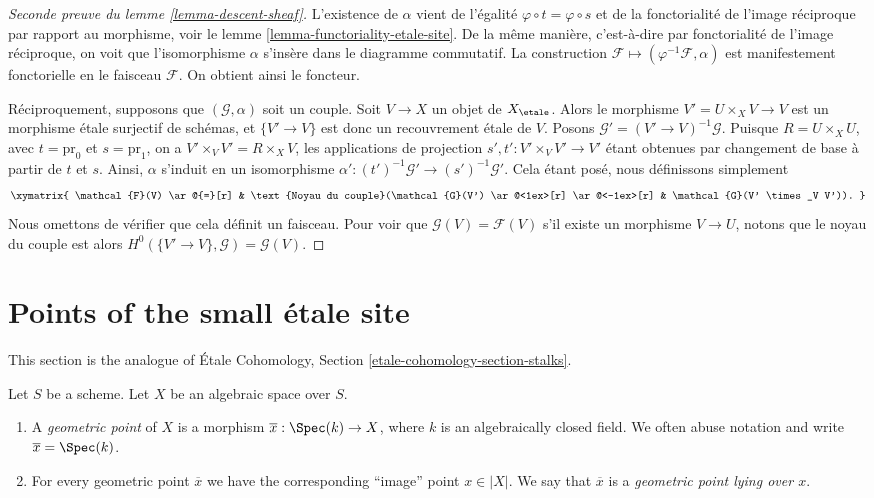 \begin{proof}[Seconde preuve du lemme \ref{lemma-descent-sheaf}]
L'existence de $\alpha$ vient de l'égalité
$\varphi \circ t = \varphi \circ s$ et de la fonctorialité de l'image réciproque
par rapport au morphisme, voir le
lemme \ref{lemma-functoriality-etale-site}.
De la même manière, c'est-à-dire par fonctorialité de l'image réciproque, on voit
que l'isomorphisme $\alpha$ s'insère dans le diagramme commutatif.
La construction $\mathcal{F} \mapsto (\varphi^{-1}\mathcal{F}, \alpha)$
est manifestement fonctorielle en le faisceau $\mathcal{F}$.
On obtient ainsi le foncteur.

\medskip\noindent
Réciproquement, supposons que $(\mathcal{G}, \alpha)$ soit un couple.
Soit $V \to X$ un objet de $X_\etale$.
Alors le morphisme $V' = U \times_X V \to V$ est un morphisme \'etale surjectif
de schémas, et $\{V' \to V\}$ est donc un recouvrement \'etale
de $V$. Posons $\mathcal{G}' = (V' \to V)^{-1}\mathcal{G}$.
Puisque $R = U \times_X U$, avec $t = \text{pr}_0$
et $s = \text{pr}_1$, on a $V' \times_V V' = R \times_X V$,
les applications de projection $s', t' : V' \times_V V' \to V'$ étant obtenues par changement de base
à partir de $t$ et $s$. Ainsi, $\alpha$ s'induit en un isomorphisme
$\alpha' : (t')^{-1}\mathcal{G}' \to (s')^{-1}\mathcal{G}'$. Cela étant posé,
nous définissons simplement
$$
\xymatrix{
\mathcal{F}(V) \ar@{=}[r] &
\text{Noyau du couple}(\mathcal{G}(V') \ar@<1ex>[r] \ar@<-1ex>[r] &
\mathcal{G}(V' \times_V V')).
}
$$
Nous omettons de vérifier que cela définit un faisceau. Pour voir que
$\mathcal{G}(V) = \mathcal{F}(V)$ s'il existe un morphisme $V \to U$,
notons que le noyau du couple est alors
$H^0(\{V' \to V\}, \mathcal{G}) = \mathcal{G}(V)$.
\end{proof}







\section{Points of the small \'etale site}
\label{section-points-small-etale-site}

\noindent
This section is the analogue of
\'Etale Cohomology, Section
\ref{etale-cohomology-section-stalks}.

\begin{definition}
\label{definition-geometric-point}
Let $S$ be a scheme. Let $X$ be an algebraic space over $S$.
\begin{enumerate}
\item A {\it geometric point} of $X$ is a morphism
$\overline{x} : \Spec(k) \to X$, where $k$ is an algebraically
closed field. We often abuse notation and
write $\overline{x} = \Spec(k)$.
\item For every geometric point $\overline{x}$ we have the corresponding
``image'' point $x \in |X|$. We say that $\overline{x}$ is a
{\it geometric point lying over $x$}.
\end{enumerate}
\end{definition}

